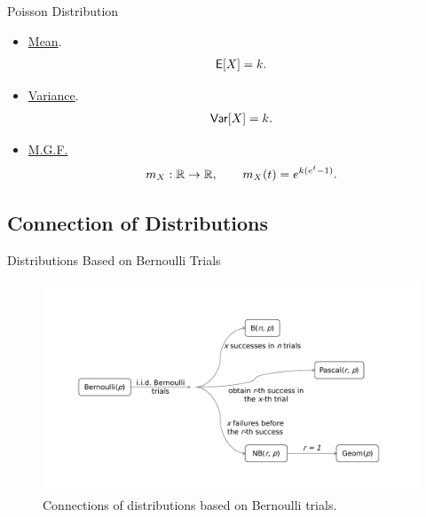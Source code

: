 \begin{frame}{Poisson Distribution}

\justifying
{} 
\begin{itemize}
\justifying
\item \underline{Mean}.
\begin{align*}
\mathsf{E}[X] = k.
\end{align*}
\item \underline{Variance}.
\begin{align*}
\mathsf{Var}[X] = k.
\end{align*}
\item \underline{M.G.F.}
\begin{align*}
m_X: \mathbb{R} \rightarrow \mathbb{R}, \qquad m_X(t) = e^{k(e^t-1)}.
\end{align*}
\end{itemize}

\end{frame}

\subsection{Connection of Distributions}

\begin{frame}{Distributions Based on Bernoulli Trials}

\begin{figure}[htbp]
	\centering
	\includegraphics[width=\linewidth]{./images/rc2fig1.pdf}
	\caption{Connections of distributions based on Bernoulli trials.}
\end{figure}

\end{frame}



